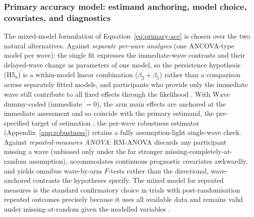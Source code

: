 \subsubsection{Primary accuracy model: estimand anchoring, model choice, covariates, and diagnostics}
\label{app:accuracy-model}
The mixed-model formulation of Equation~\eqref{eq:primary-acc} is chosen over the two natural alternatives. Against \emph{separate per-wave analyses} (one ANCOVA-type model per wave): the single fit expresses the immediate-wave contrasts and their delayed-wave change as parameters of one model, so the persistence hypothesis (H5$_a$) is a within-model linear combination ($\beta_2+\beta_5$) rather than a comparison across separately fitted models, and participants who provide only the immediate wave still contribute to all fixed effects through the likelihood \parencite{detry2016,bell2020}. %
With $\mathrm{Wave}$ dummy-coded (immediate $=0$), the arm main effects are anchored at the immediate assessment and so coincide with the primary estimand, the pre-specified target of estimation \parencite{ich2019}; the per-wave \textcite{lin2013} robustness estimator (Appendix~\ref{app:robustness}) retains a fully assumption-light single-wave check. Against \emph{repeated-measures ANOVA}: RM-ANOVA discards any participant missing a wave (unbiased only under the far stronger missing-completely-at-random assumption), accommodates continuous prognostic covariates awkwardly, and yields omnibus wave-by-arm $F$-tests rather than the directional, wave-anchored contrasts the hypotheses specify. The mixed model for repeated measures is the standard confirmatory choice in trials with post-randomisation repeated outcomes precisely because it uses all available data and remains valid under missing-at-random given the modelled variables \parencite{detry2016,bell2020}.

